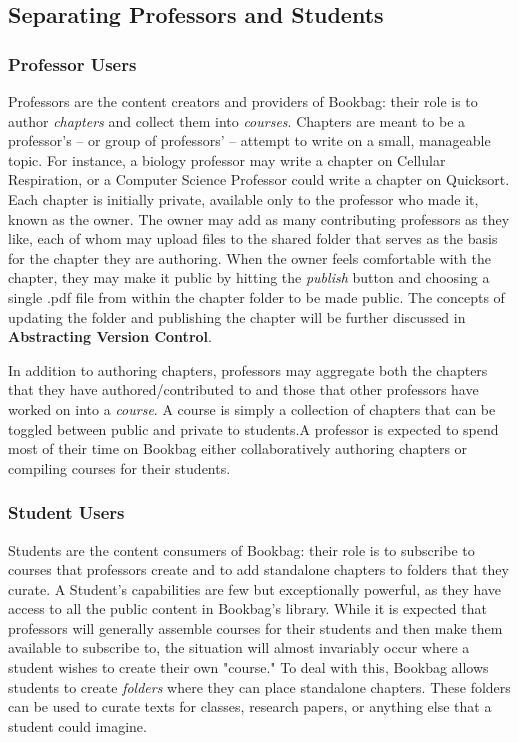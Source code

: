 \documentclass[pageno]{jpaper}
\begin{document}
\subsection{Separating Professors and Students}
\subsubsection{Professor Users}

Professors are the content creators and providers of Bookbag: their role is to author \textit{chapters} and collect them into \textit{courses}. Chapters are meant to be a professor's – or group of professors' – attempt to write on a small, manageable topic. For instance, a biology professor may write a chapter on Cellular Respiration, or a Computer Science Professor could write a chapter on Quicksort. Each chapter is initially private, available only to the professor who made it, known as the owner. The owner may add as many contributing professors as they like, each of whom may upload files to the shared folder that serves as the basis for the chapter they are authoring. When the owner feels comfortable with the chapter, they may make it public by hitting the \textit{publish} button and choosing a single .pdf file from within the chapter folder to be made public. The concepts of updating the folder and publishing the chapter will be further discussed in \textbf{Abstracting Version Control}. 

In addition to authoring chapters, professors may aggregate both the chapters that they have authored/contributed to and those that other professors have worked on into a \textit{course}. A course is simply a collection of chapters that can be toggled between public and private to students.A professor is expected to spend most of their time on Bookbag either collaboratively authoring chapters or compiling courses for their students.
\subsubsection{Student Users}

Students are the content consumers of Bookbag: their role is to subscribe to courses that professors create and to add standalone chapters to folders that they curate. A Student's capabilities are few but exceptionally powerful, as they have access to all the public content in Bookbag's library. While it is expected that professors will generally assemble courses for their students and then make them available to subscribe to, the situation will almost invariably occur where a student wishes to create their own "course." To deal with this, Bookbag allows students to create \textit{folders} where they can place standalone chapters. These folders can be used to curate texts for classes, research papers, or anything else that a student could imagine.
\end{document}
